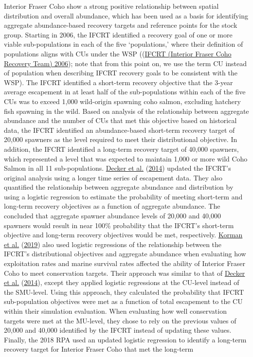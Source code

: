 \documentclass[11pt]{book}
\begin{document}
Interior Fraser Coho show a strong positive relationship between spatial distribution and overall abundance, which has been used as a basis for identifying aggregate abundance-based recovery targets and reference points for the stock group. Starting in 2006, the IFCRT identified a recovery goal of one or more viable sub-populations in each of the five `populations,' where their definition of populations aligns with CUs under the WSP ((\protect\hyperlink{ref-ifcrtinteriorfrasercohorecoveryteamConservationStrategyCoho2006}{IFCRT (Interior Fraser Coho Recovery Team) 2006}); note that from this point on, we use the term CU instead of population when describing IFCRT recovery goals to be consistent with the WSP). The IFCRT identified a short-term recovery objective that the 3-year average escapement in at least half of the sub-populations within each of the five CUs was to exceed 1,000 wild-origin spawning coho salmon, excluding hatchery fish spawning in the wild. Based on analysis of the relationship between aggregate abundance and the number of CUs that met this objective based on historical data, the IFCRT identified an abundance-based short-term recovery target of 20,000 spawners as the level required to meet their distributional objective. In addition, the IFCRT identified a long-term recovery target of 40,000 spawners, which represented a level that was expected to maintain 1,000 or more wild Coho Salmon in all 11 sub-populations. \protect\hyperlink{ref-deckerAssessmentInteriorFraser2014}{Decker et al.} (\protect\hyperlink{ref-deckerAssessmentInteriorFraser2014}{2014}) updated the IFCRT's original analysis using a longer time series of escapement data. They also quantified the relationship between aggregate abundance and distribution by using a logistic regression to estimate the probability of meeting short-term and long-term recovery objectives as a function of aggregate abundance. The concluded that aggregate spawner abundance levels of 20,000 and 40,000 spawners would result in near 100\% probability that the IFCRT's short-term objective and long-term recovery objectives would be met, respectively. \protect\hyperlink{ref-kormanEvaluationFrameworkAssessing2019}{Korman et al.} (\protect\hyperlink{ref-kormanEvaluationFrameworkAssessing2019}{2019}) also used logistic regressions of the relationship between the IFCRT's distributional objectives and aggregate abundance when evaluating how exploitation rates and marine survival rates affected the ability of Interior Fraser Coho to meet conservation targets. Their approach was similar to that of \protect\hyperlink{ref-deckerAssessmentInteriorFraser2014}{Decker et al.} (\protect\hyperlink{ref-deckerAssessmentInteriorFraser2014}{2014}), except they applied logistic regressions at the CU-level instead of the SMU-level. Using this approach, they calculated the probability that IFCRT sub-population objectives were met as a function of total escapement to the CU within their simulation evaluation. When evaluating how well conservation targets were met at the MU-level, they chose to rely on the previous values of 20,000 and 40,000 identified by the IFCRT instead of updating these values. Finally, the 2018 RPA used an updated logistic regression to identify a long-term recovery target for Interior Fraser Coho that met the long-term 
\end{document}
